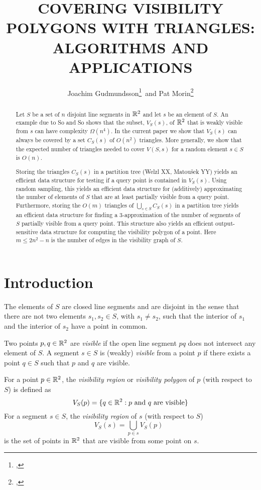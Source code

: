 \documentclass{patmorin}
\title{\MakeUppercase{Covering Visibility Polygons with Triangles:\newline
       Algorithms and Applications}}
\author{Joachim Gudmundsson\thanks{\affil{NICTA},
\email{joachim.gudmundsson@nicta.com.au}}\, 
       and Pat Morin\thanks{\affil{Carleton University},
\email{morin@scs.carleton.ca}}}
\begin{document}
\maketitle
\begin{abstract}
Let $S$ be a set of $n$ disjoint line segments in $\mathbb{R}^2$ and let $s$ be an
element of $S$.  An example due to So and So shows that the subset,
$V_S(s)$, of $\mathbb{R}^2$ that is weakly visible from $s$ can have complexity
$\Omega(n^4)$.  In the current paper we show that $V_S(s)$ can always be
covered by a set $C_S(s)$ of $O(n^2)$ triangles.  More generally, we show
that the expected number of triangles needed to cover $V(S,s)$ for a random
element $s\in S$ is $O(n)$.

Storing the triangles $C_S(s)$ in a partition tree (Welzl XX, Matou\v{s}ek
YY) yields an efficient data structure for testing if a query point is
contained in $V_S(s)$. Using random sampling, this yields an efficient
data structure for (additively) approximating the number of elements of
$S$ that are at least partially visible from a query point.  Furthermore,
storing the $O(m)$ triangles of $\bigcup_{s\in S} C_S(s)$ in a partition
tree yields an efficient data structure for finding a 3-approximation
of the number of segments of $S$ partially visible from a query point.
This structure also yields an efficient output-sensitive data structure
for computing the visibility polygon of a point.  Here $m\le 2n^2-n$
is the number of edges in the visibility graph of $S$.
\end{abstract}

\section{Introduction}


The elements of $S$ are closed line segments and are disjoint in the sense
that there are not two elements $s_1,s_2\in S$, with $s_1\neq s_2$, such
that the interior of $s_1$ and the interior of $s_2$ have a point in
common.

Two points $p,q\in\mathbb{R}^2$ are \emph{visible} if the open line segment $pq$
does not intersect any element of $S$.  A segment $s\in S$ is (weakly)
\emph{visible} from a point $p$ if there exists a point $q\in S$ such that
$p$ and $q$ are visible.

For a point $p\in\mathbb{R}^2$, the \emph{visibility region} or \emph{visibility
polygon} of $p$ (with respect to $S$) is defined as
\[
   V_S(p)=\{q\in\mathbb{R}^2:\mbox{$p$ and $q$ are visible}\}
\]
For a segment $s\in S$, the \emph{visibility region} of $s$ (with respect
to $S$)
\[
   V_S(s)=\bigcup_{p\in s} V_S(p) \enspace 
\]
is the set of points in $\mathbb{R}^2$ that are visible from some point on $s$.
\end{document}
